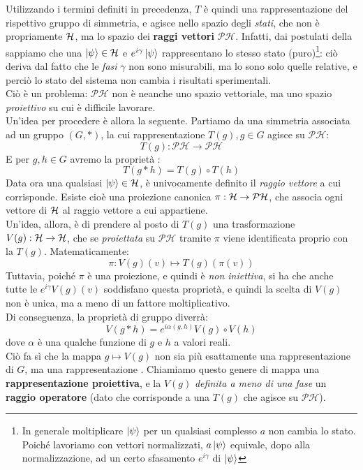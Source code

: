 \documentclass[../../FisicaTeorica.tex]{subfiles}
\begin{document}
Utilizzando i termini definiti in precedenza, $T$ è quindi una rappresentazione del rispettivo gruppo di simmetria, e agisce nello spazio degli \textit{stati}, che non è propriamente $\mathcal{H}$, ma lo spazio dei \textbf{raggi vettori} $\mathcal{PH}$. Infatti, dai postulati della \MQ sappiamo che una $\ket{\psi} \in \mathcal{H}$ e $e^{i\gamma} \ket{\psi}$ rappresentano lo stesso stato (puro)\footnote{In generale moltiplicare $\ket{\psi}$ per un qualsiasi complesso $a$ non cambia lo stato. Poiché lavoriamo con vettori normalizzati, $a\ket{\psi}$ equivale, dopo alla normalizzazione, ad un certo sfasamento $e^{i\gamma}$ di $\ket{\psi}$}: ciò deriva dal fatto che le \textit{fasi }  $\gamma$ non sono misurabili, ma lo sono solo quelle relative, e perciò  lo stato del sistema non cambia i risultati sperimentali.\\
Ciò è un problema: $\mathcal{PH}$ non è neanche uno spazio vettoriale, ma uno spazio \textit{proiettivo} su cui è difficile lavorare.\\
Un'idea per procedere è allora la seguente. Partiamo da una simmetria associata ad un gruppo $(G,*)$, la cui rappresentazione $T(g), g\in G$ agisce su $\mathcal{PH}$:
\[
T(g):\mathcal{PH}\to \mathcal{PH}
\]
E per $g, h \in G$ avremo la proprietà :
\[
T(g*h) = T(g) \circ T(h)
\]
Data ora una qualsiasi $\ket{\psi}\in \mathcal{H}$, è univocamente definito il \textit{raggio vettore} a cui corrisponde. Esiste cioè una proiezione canonica $\pi:\mathcal{H} \to \mathcal{PH}$, che associa ogni vettore di $\mathcal{H}$ al raggio vettore a cui appartiene.\\
Un'idea, allora, è di prendere al posto di $T(g)$ una trasformazione $V(g):\mathcal{H}\to \mathcal{H}$, che se \textit{proiettata} su $\mathcal{PH}$ tramite $\pi$ viene identificata proprio con la $T(g)$. Matematicamente:
\[
\pi: 
V(g)(v)\mapsto T(g)(\pi(v))
\]
Tuttavia, poiché $\pi$ è una proiezione, e quindi è \textit{non iniettiva}, si ha che anche tutte le $e^{i\gamma}V(g)(v)$ soddisfano questa proprietà, e quindi la scelta di $V(g)$ non è unica, ma a meno di un fattore moltiplicativo.\\
Di conseguenza, la proprietà di gruppo diverrà:
\[
V(g*h) = e^{i\alpha(g,h)} V(g) \circ V(h)
\]
dove $\alpha$ è una qualche funzione di $g$ e $h$ a valori reali.\\
Ciò fa sì che la mappa $g \mapsto V(g)$ non sia più esattamente una rappresentazione di $G$, ma una rappresentazione . Chiamiamo questo genere di mappa una \textbf{rappresentazione proiettiva}, e la $V(g)$ \textit{definita a meno di una fase} un \textbf{raggio operatore} (dato che corrisponde a una $T(g)$ che agisce su $\mathcal{PH}$).\\
\end{document}
